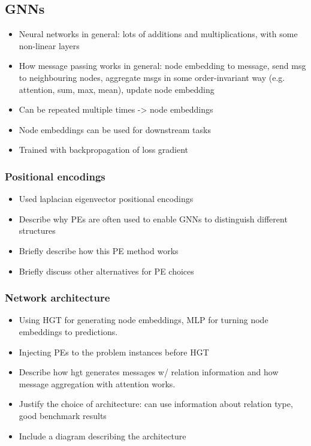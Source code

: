 \documentclass[english, 12pt, a4paper, sci, utf8, a-2b, online]{aaltothesis}
\begin{document}
\subsection{GNNs}
\begin{itemize}
    \item Neural networks in general: lots of additions and multiplications, with some non-linear layers
    \item How message passing works in general: node embedding to message, send msg to neighbouring nodes, aggregate msgs in some order-invariant way (e.g. attention, sum, max, mean), update node embedding
    \item Can be repeated multiple times -> node embeddings
    \item Node embeddings can be used for downstream tasks
    \item Trained with backpropagation of loss gradient
\end{itemize}


\subsubsection{Positional encodings}
\begin{itemize}
    \item Used laplacian eigenvector positional encodings
    \item Describe why PEs are often used to enable GNNs to distinguish different structures
    \item Briefly describe how this PE method works
    \item Briefly discuss other alternatives for PE choices
\end{itemize}

\subsubsection{Network architecture}
\begin{itemize}
    \item Using HGT for generating node embeddings, MLP for turning node embeddings to predictions.
    \item Injecting PEs to the problem instances before HGT
    \item Describe how hgt generates messages w/ relation information and how message aggregation with attention works.
    \item Justify the choice of architecture: can use information about relation type, good benchmark results
    \item Include a diagram describing the architecture
\end{itemize}
\end{document}
